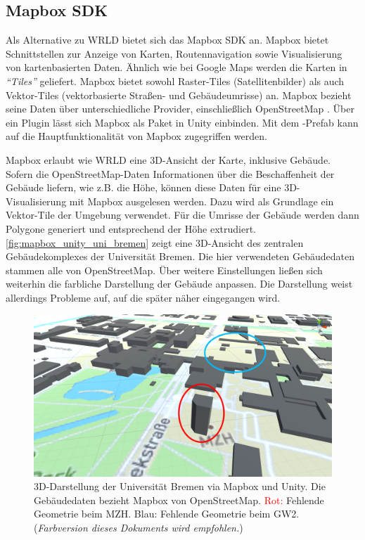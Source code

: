 \subsection{Mapbox SDK}
Als Alternative zu WRLD bietet sich das Mapbox SDK an.
Mapbox bietet Schnittstellen zur Anzeige von Karten, Routennavigation sowie Visualisierung von kartenbasierten Daten.
Ähnlich wie bei Google Maps werden die Karten in \emph{\enquote{Tiles}} geliefert.
Mapbox bietet sowohl Raster-Tiles (Satellitenbilder) als auch Vektor-Tiles (vektorbasierte Straßen- und Gebäudeumrisse) an.
Mapbox bezieht seine Daten über unterschiedliche Provider, einschließlich OpenStreetMap \autocite{Mapbox2018}.
Über ein Plugin lässt sich Mapbox als Paket in Unity einbinden.
Mit dem -Prefab kann auf die Hauptfunktionalität von Mapbox zugegriffen werden.

Mapbox erlaubt wie WRLD eine 3D-Ansicht der Karte, inklusive Gebäude.
Sofern die OpenStreetMap-Daten Informationen über die Beschaffenheit der Gebäude liefern, wie z.B. die Höhe, können diese Daten für eine 3D-Visualisierung mit Mapbox ausgelesen werden.
Dazu wird als Grundlage ein Vektor-Tile der Umgebung verwendet.
Für die Umrisse der Gebäude werden dann Polygone generiert und entsprechend der Höhe extrudiert.
\autoref{fig:mapbox_unity_uni_bremen} zeigt eine 3D-Ansicht des zentralen Gebäudekomplexes der Universität Bremen.
Die hier verwendeten Gebäudedaten stammen alle von OpenStreetMap.
Über weitere Einstellungen ließen sich weiterhin die farbliche Darstellung der Gebäude anpassen.
Die Darstellung weist allerdings Probleme auf, auf die später näher eingegangen wird.

\begin{figure}
    \centering
    \includegraphics[width=\textwidth]{figures/mapbox_unity_uni_bremen_markings}
    \caption{3D-Darstellung der Universität Bremen via Mapbox und Unity. %
    Die Gebäudedaten bezieht Mapbox von OpenStreetMap. %
    \textcolor{red}{Rot:} Fehlende Geometrie beim MZH.\@ %
    \textcolor[HTML]{00bdff}{Blau:} Fehlende Geometrie beim GW2. %
    (\textit{Farbversion dieses Dokuments wird empfohlen.})}
    \label{fig:mapbox_unity_uni_bremen}
\end{figure}

